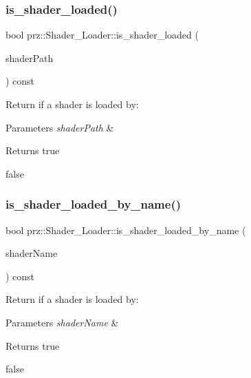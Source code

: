 \subsubsection{\texorpdfstring{is\_shader\_loaded()}{is\_shader\_loaded()}}
{\footnotesize\ttfamily bool prz\+::\+Shader\+\_\+\+Loader\+::is\+\_\+shader\+\_\+loaded (\begin{DoxyParamCaption}\item[{const P\+String \&}]{shader\+Path }\end{DoxyParamCaption}) const\hspace{0.3cm}{\ttfamily [inline]}}



Return if a shader is loaded by\+: 


\begin{DoxyParams}{Parameters}
{\em shader\+Path} & \\
\hline
\end{DoxyParams}
\begin{DoxyReturn}{Returns}
true 

false 
\end{DoxyReturn}
\mbox{\label{classprz_1_1_shader___loader_ad01ebe77c757cac0163e0c46dec05999}} 
\subsubsection{\texorpdfstring{is\_shader\_loaded\_by\_name()}{is\_shader\_loaded\_by\_name()}}
{\footnotesize\ttfamily bool prz\+::\+Shader\+\_\+\+Loader\+::is\+\_\+shader\+\_\+loaded\+\_\+by\+\_\+name (\begin{DoxyParamCaption}\item[{const P\+String \&}]{shader\+Name }\end{DoxyParamCaption}) const\hspace{0.3cm}{\ttfamily [inline]}}



Return if a shader is loaded by\+: 


\begin{DoxyParams}{Parameters}
{\em shader\+Name} & \\
\hline
\end{DoxyParams}
\begin{DoxyReturn}{Returns}
true 

false 
\end{DoxyReturn}
\mbox{\label{classprz_1_1_shader___loader_a927613e561c82e198f6a1764be622645}} 
